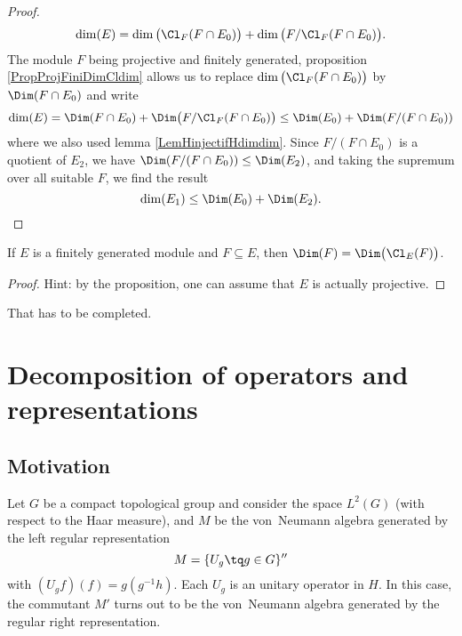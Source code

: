 \begin{proof}
\begin{equation}
	\dim(E)=\dim\big( \Cl_F(F\cap E_0) \big)+\dim\big( F/\Cl_F(F\cap E_0) \big).
\end{equation}
The module $F$ being projective and finitely generated, proposition \ref{PropProjFiniDimCldim} allows us to replace $\dim\big( \Cl_F(F\cap E_0) \big)$ by $\Dim(F\cap E_0)$ and write
\begin{equation}
	\dim(E)=\Dim(F\cap E_0)+\Dim\big( F/\Cl_F(F\cap E_0) \big)\leq \Dim(E_0)+\Dim(F/(F\cap E_0))
\end{equation}
where we also used lemma \ref{LemHinjectifHdimdim}. Since $F/(F\cap E_0)$ is a quotient of $E_2$, we have $\Dim(F/(F\cap E_0))\leq\Dim(E_2)$, and taking the supremum over all suitable $F$, we find the result
\begin{equation}
	\dim(E_1)\leq \Dim(E_0)+\Dim(E_2).
\end{equation}
\end{proof}

\begin{proposition}
If $E$ is a finitely generated module and $F\subseteq E$, then $\Dim(F)=\Dim\big(\Cl_E(F)\big)$.
\end{proposition}
\begin{proof}
Hint: by the proposition, one can assume that $E$ is actually projective.
\end{proof}
\begin{probleme}
 That has to be completed.
\end{probleme}
					\section{Decomposition of operators and representations}

					\subsection{Motivation}

Let $G$ be a compact topological group and consider the space $L^2(G)$ (with respect to the Haar measure), and $M$ be the von~Neumann algebra generated by the left regular representation
\begin{equation}
	M=\{ U_g\tq g\in G \}''
\end{equation}
with $(U_gf)(f)=g(g^{-1} h)$. Each $U_g$ is an unitary operator in $H$. In this case, the commutant $M'$ turns out to be the von~Neumann algebra generated by the regular right representation.

